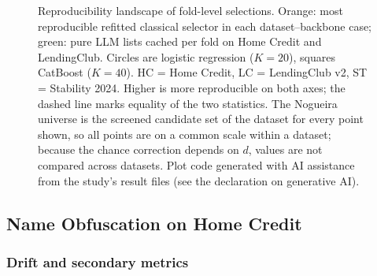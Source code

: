 \documentclass[final,5p,twocolumn]{elsarticle}
\newcommand{\Kfeat}{K}
\providecommand{\DIFaddtex}[1]{{\protect\color{blue} \sf #1}} %
\providecommand{\DIFdeltex}[1]{{\protect\color{red} \scriptsize #1}} %
\providecommand{\DIFaddbegin}{} %
\providecommand{\DIFaddend}{} %
\providecommand{\DIFdelbegin}{} %
\providecommand{\DIFdelend}{} %
\providecommand{\DIFaddendFL}{} %
\providecommand{\DIFadd}[1]{\texorpdfstring{\DIFaddtex{#1}}{#1}} %
\providecommand{\DIFdel}[1]{\texorpdfstring{\DIFdeltex{#1}}{}} %
\begin{document}
\begin{figure}[htbp]
\DIFaddendFL \caption{Reproducibility landscape of fold-level selections. Orange: most reproducible refitted classical selector in each dataset--backbone case; green: pure LLM lists cached per fold on Home Credit and LendingClub. Circles are logistic regression ($\Kfeat=20$), squares CatBoost ($\Kfeat=40$). HC = Home Credit, LC = LendingClub v2, ST = Stability 2024. Higher is more reproducible on both axes; the dashed line marks equality of the two statistics. The Nogueira universe is the screened candidate set of the dataset for every point shown, so all points are on a common scale within a dataset; because the chance correction depends on $d$, values are not compared across datasets. Plot code generated with AI assistance from the study's result files (see the declaration on generative AI).}
\label{fig:stability}
\end{figure}

\DIFdelbegin \subsection{\DIFdel{Name Obfuscation on Home Credit}}
\addtocounter{subsection}{-1}%
\DIFdelend \DIFaddbegin \subsubsection{\DIFadd{Drift and secondary metrics}}
\label{subsec:secondary_results}
\DIFaddend 
\end{document}
